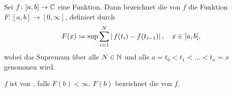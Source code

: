 Sei $f\colon [a,b]\to\mathbb{C}$ eine Funktion. \pause Dann bezeichnet die  von $f$ die Funktion $F\colon[a,b]\to [0,\infty]$, definiert durch \pause
\begin{equation*}
    F(x)\coloneqq \sup \sum_{i=1}^N \left| \,f(t_i) - f(t_{i-1})\right|, \quad x\in[a,b],
\end{equation*}
\pause
wobei das Supremum über alle $N\in\mathbb{N}$ \pause und alle $a =t_0<t_1<\dots<t_n = x$ genommen wird. \pause

$f$ ist von , falls $F(b)<\infty$. \pause $F(b)$ bezeichnet die  von $f$.